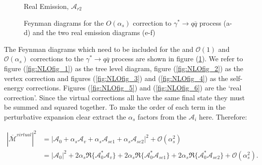 \begin{figure}[tpb]
\begin{minipage}{0.4\linewidth}
				\caption{Real Emission, $\mathcal{A}_{r2}$}
				\label{fig:NLOfig_6}
			\end{minipage}
		\caption{Feynman diagrams for the $O(\alpha_s)$ correction to $\gamma^*\rightarrow q\overline{q}$
		process (a-d) and the two real emission diagrams (e-f)}\label{fig:NLOContributions}
	\end{figure}

	The Feynman diagrams which need to be included for the and $\mathcal{O}(1)$ and $\mathcal{O}(\alpha_s)$ corrections to the
	$\gamma^*\rightarrow q\overline{q}$ process are shown in figure (\ref{fig:NLOContributions}).  We refer to figure (\ref{fig:NLOfig_1}) as the tree level diagram,
	figure (\ref{fig:NLOfig_2}) as the vertex correction and figures (\ref{fig:NLOfig_3}) and (\ref{fig:NLOfig_4}) as the self-energy corrections.
	Figures (\ref{fig:NLOfig_5}) and (\ref{fig:NLOfig_6}) are the `real correction'.  Since the virtual corrections all have the same final state
	they must be summed and squared together.  To make the order of each term in the perturbative expansion clear extract the $\alpha_s$
	factors from the $\mathcal{A}_i$ here.  Therefore:

	\begin{equation}
	\begin{split}
	|\overline{\mathcal{M}}^{virtual}|^2 &= |\mathcal{A}_0 + \alpha_s\mathcal{A}_v + \alpha_s\mathcal{A}_{se1} + \alpha_s\mathcal{A}_{se2}|^2 + \mathcal{O}(\alpha_s^2) \\
	&= |\mathcal{A}_0|^2 + 2\alpha_s\Re\{\mathcal{A}^*_0\mathcal{A}_v\} + 2\alpha_s\Re\{\mathcal{A}^*_0\mathcal{A}_{se1}\} + 2\alpha_s\Re\{\mathcal{A}^*_0\mathcal{A}_{se2}\} + \mathcal{O}(\alpha_s^2).
	\end{split}
	\end{equation}


